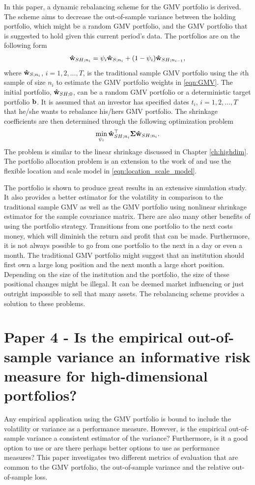 \documentclass[12pt, oneside]{book}\usepackage{knitr}
\begin{document}
{In this paper, a dynamic rebalancing scheme for the GMV portfolio is derived. 
The scheme aims to decrease the out-of-sample variance between the holding portfolio, which might be a random GMV portfolio, and the GMV portfolio that is suggested to hold given this current period's data. 
The portfolios are on the following form
\begin{equation}
  \mathbf{\hat{w}}_{SH;n_{i}}=\psi_{i}\mathbf{\hat{w}}_{S;n_i}+ (1-\psi_{i})\mathbf{\hat{w}}_{SH;n_{i-1}},
\end{equation}
where $\mathbf{\hat{w}}_{S;n_i}$, $i=1,2,...,T$, is the traditional sample GMV portfolio using the $i$th sample of size $n_i$ to estimate the GMV portfolio weights in \eqref{eqn:GMV}. 
The initial portfolio, $\mathbf{\hat{w}}_{SH;0}$, can be a random GMV portfolio or a deterministic target portfolio $\mathbf{b}$.
It is assumed that an investor has specified dates $t_i$, $i=1,2,...,T$ that he/she wants to rebalance his/hers GMV portfolio. 
The shrinkage coefficients are then determined through the following optimization problem
$$
\min_{\psi_i} \mathbf{\hat{w}}_{SH;n_{i}}^\top \mathbf{\Sigma} \mathbf{\hat{w}}_{SH;n_{i}}.
$$
The problem is similar to the linear shrinkage discussed in Chapter \ref{ch:highdim}.
The portfolio allocation problem is an extension to the work of \citet{bodnar2018estimation} and use the flexible location and scale model in \eqref{eqn:location_scale_model}.

The portfolio is shown to produce great results in an extensive simulation study.
It also provides a better estimator for the volatility in comparison to the traditional sample GMV as well as the GMV portfolio using \citet{lw20} nonlinear shrinkage estimator for the sample covariance matrix.
There are also many other benefits of using the portfolio strategy.
Transitions from one portfolio to the next costs money, which will diminish the return and profit that can be made.
Furthermore, it is not always possible to go from one portfolio to the next in a day or even a month.
The traditional GMV portfolio might suggest that an institution should first own a large long position and the next month a large short position.
Depending on the size of the institution and the portfolio, the size of these positional changes might be illegal. 
It can be deemed market influencing or just outright impossible to sell that many assets.
The rebalancing scheme provides a solution to these problems.

\section{Paper 4 - Is the empirical out-of-sample variance an informative risk measure for high-dimensional portfolios?}\label{sec:paper4}
Any empirical application using the GMV portfolio is bound to include the volatility or variance as a performance measure. 
However, is the empirical out-of-sample variance a consistent estimator of the variance? 
Furthermore, is it a good option to use or are there perhaps better options to use as performance measures? 
This paper investigates two different metrics of evaluation that are common to the GMV portfolio, the out-of-sample variance and the relative out-of-sample loss. 

}
\end{document}
